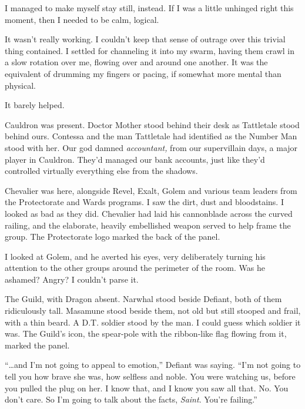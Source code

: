 I managed to make myself stay still, instead.  If I was a little unhinged right this moment, then I needed to be calm, logical.



It wasn't really working.  I couldn't keep that sense of outrage over this trivial thing contained.  I settled for channeling it into my swarm, having them crawl in a slow rotation over me, flowing over and around one another.  It was the equivalent of drumming my fingers or pacing, if somewhat more mental than physical.



It barely helped.



Cauldron was present.  Doctor Mother stood behind their desk as Tattletale stood behind ours.  Contessa and the man Tattletale had identified as the Number Man stood with her.  Our god damned \emph{accountant, }from our supervillain days, a major player in Cauldron.  They'd managed our bank accounts, just like they'd controlled virtually everything else from the shadows.



Chevalier was here, alongside Revel, Exalt, Golem and various team leaders from the Protectorate and Wards programs.  I saw the dirt, dust and bloodstains.  I looked as bad as they did.  Chevalier had laid his cannonblade across the curved railing, and the elaborate, heavily embellished weapon served to help frame the group.  The Protectorate logo marked the back of the panel.



I looked at Golem, and he averted his eyes, very deliberately turning his attention to the other groups around the perimeter of the room.  Was he ashamed?  Angry?  I couldn't parse it.



The Guild, with Dragon absent.  Narwhal stood beside Defiant, both of them ridiculously tall.  Masamune stood beside them, not old but still stooped and frail, with a thin beard.  A D.T. soldier stood by the man.  I could guess which soldier it was.  The Guild's icon, the spear-pole with the ribbon-like flag flowing from it, marked the panel.



``\ldots{}and I'm not going to appeal to emotion,'' Defiant was saying.  ``I'm not going to tell you how brave she was, how selfless and noble.  You were watching us, before you pulled the plug on her.  I know that, and I know you saw all that.  No.  You don't care.  So I'm going to talk about the facts, \emph{Saint}.  You're failing.''



